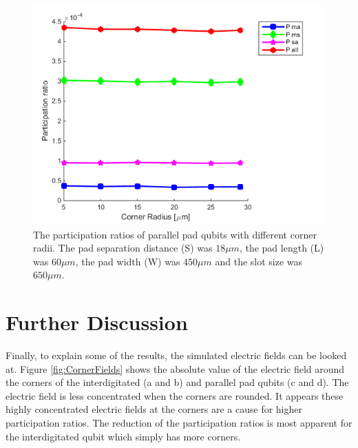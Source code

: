  \begin{figure}
 	\centering
 	\includegraphics[scale = 0.7]{Figures/Ratio_plots/IBMCornerRadius_legend}
 	\caption{The participation ratios of parallel pad qubits with different corner radii. The pad separation distance (S) was \(18 \mu m\), the pad length (L) was \(60 \mu m\), the pad width (W) was \(450 \mu m\) and the slot size was \(650 \mu m\).}
 	\label{fig:IBMCornerRadius_legend}
 \end{figure}
 
\clearpage
\section{Further Discussion}
Finally, to explain some of the results, the simulated electric fields can be looked at. Figure \ref{fig:CornerFields} shows the absolute value of the electric field around the corners of the interdigitated (a and b) and parallel pad qubits (c and d). The electric field is less concentrated when the corners are rounded. It appears these highly concentrated electric fields at the corners are a cause for higher participation ratios. The reduction of the participation ratios is most apparent for the interdigitated qubit which simply has more corners.

